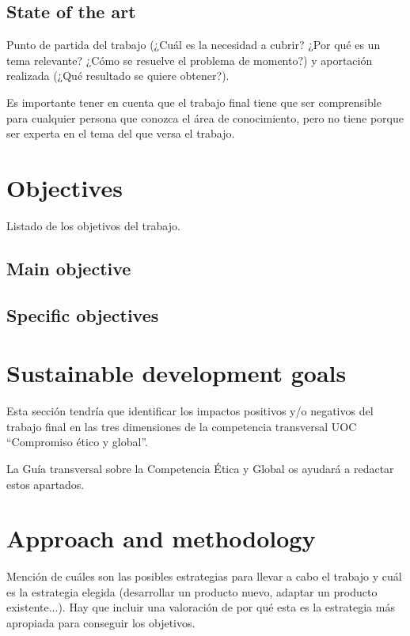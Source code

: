 \documentclass[ENG, BIB]{TFUOC}%
\begin{document}
\section{State of the art}

Punto de partida del trabajo (¿Cuál es la necesidad a cubrir? ¿Por qué es un tema relevante? ¿Cómo se resuelve el problema de momento?) y aportación realizada (¿Qué resultado se quiere obtener?).

Es importante tener en cuenta que el trabajo final tiene que ser comprensible para cualquier persona que conozca el área de conocimiento, pero no tiene porque ser experta en el tema del que versa el trabajo.

\chapter{Objectives}

Listado de los objetivos del trabajo.

\section{Main objective}

\section{Specific objectives}


\chapter{Sustainable development goals}
\label{s:etic}

Esta sección tendría que identificar los impactos positivos y/o negativos del trabajo final en las tres dimensiones de la competencia transversal UOC “Compromiso ético y global”.
 
La Guía transversal sobre la Competencia Ética y Global os ayudará a redactar estos apartados.

\chapter{Approach and methodology}
Mención de cuáles son las posibles estrategias para llevar a cabo el trabajo y cuál es la estrategia elegida (desarrollar un producto nuevo, adaptar un producto existente...). Hay que incluir una valoración de por qué esta es la estrategia más apropiada para conseguir los objetivos.   	
\end{document}
